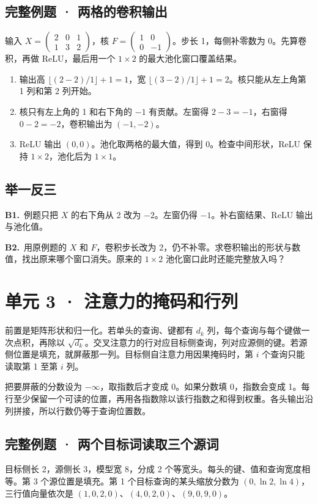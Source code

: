 \documentclass[UTF8,a4paper,11pt]{ctexart}
\newcommand{\PracticeQuestion}[3]{\par\Needspace{4\baselineskip}\noindent\begin{minipage}{\linewidth}\textbf{#1.}\ #2\par\noindent\rule{0pt}{#3mm}\par\end{minipage}\par}
\begin{document}
\subsection{完整例题 · 两格的卷积输出}
输入 $X=\begin{pmatrix}2&0&1\\1&3&2\end{pmatrix}$，核 $F=\begin{pmatrix}1&0\\0&-1\end{pmatrix}$。步长 1，每侧补零数为 0。先算卷积，再做 ReLU，最后用一个 $1\times2$ 的最大池化窗口覆盖结果。

\begin{enumerate}
\item 输出高 $\lfloor(2-2)/1\rfloor+1=1$，宽 $\lfloor(3-2)/1\rfloor+1=2$。核只能从左上角第 1 列和第 2 列开始。
\item 核只有左上角的 1 和右下角的 $-1$ 有贡献。左窗得 $2-3=-1$，右窗得 $0-2=-2$，卷积输出为 $(-1,-2)$。
\item ReLU 输出 $(0,0)$。池化取两格的最大值，得到 0。检查中间形状，ReLU 保持 $1\times2$，池化后为 $1\times1$。
\end{enumerate}
\subsection{举一反三}
\PracticeQuestion{B1}{例题只把 $X$ 的右下角从 2 改为 $-2$。左窗仍得 $-1$。补右窗结果、ReLU 输出与池化值。}{24}
\PracticeQuestion{B2}{用原例题的 $X$ 和 $F$，卷积步长改为 2，仍不补零。求卷积输出的形状与数值，找出原来哪个窗口消失。原来的 $1\times2$ 池化窗口此时还能完整放入吗？}{34}
\clearpage
\section{单元 3 · 注意力的掩码和行列}
前置是矩阵形状和归一化。若单头的查询、键都有 $d_k$ 列，每个查询与每个键做一次点积，再除以 $\sqrt{d_k}$。交叉注意力的行对应目标侧查询，列对应源侧的键。若源侧位置是填充，就屏蔽那一列。目标侧自注意力用因果掩码时，第 $i$ 个查询只能读取第 1 至第 $i$ 列。

把要屏蔽的分数设为 $-\infty$，取指数后才变成 0。如果分数填 0，指数会变成 1。每行至少保留一个可读的位置，再用各指数除以该行指数之和得到权重。各头输出沿列拼接，所以行数仍等于查询位置数。

\subsection{完整例题 · 两个目标词读取三个源词}
目标侧长 2，源侧长 3，模型宽 8，分成 2 个等宽头。每头的键、值和查询宽度相等。第 3 个源位置是填充。第 1 个目标查询的某头缩放分数为 $(0,\ln2,\ln4)$，三行值向量依次是 $(1,0,2,0)$、$(4,0,2,0)$、$(9,0,9,0)$。
\end{document}
